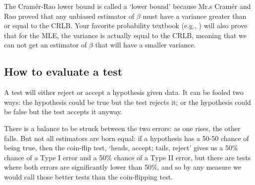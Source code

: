 
The Cram\'er-Rao lower bound is
called a `lower bound' because Mr.s Cram\'er and Rao proved that any
unbiased estimator of $\beta$ must have a variance greater than or equal to the
CRLB. Your favorite probability textbook (e.g., \cite{casella:berger})
will also prove that for the MLE, the variance is actually equal to the
CRLB, meaning that we can not get an estimator of $\beta$ that will
have a smaller variance.

\subsection{How to evaluate a test}
A test will either reject or accept a hypothesis given data. It can be
fooled two ways: the hypothesis could be true but the test rejects it;
or the hypothesis could be false but the test accepts it anyway. 

\marginaliafixed{16}{Evaluation vocab}{
Here are some vocabulary terms; if you are in a stats class right now,
you will be tested on this:

Likelihood of a \vocab{Type I error} $\equiv\alpha$: rejecting the null when it is true.

Likelihood of a \vocab{Type II error} $\equiv\beta$: accepting the null when
it is false.

\airq{Power}$\equiv 1-\beta$, or the likelihood of rejecting a false null.\blindvocab{power}

\airq{Unbiased}$\equiv (1-\beta)\geq \alpha\ \forall$ values of the parameter.
I.e., you are less likely to accept the null when it is false than when
it is true.\blindvocab{unbiased estimator}

\airq{Consistency}$\equiv$ the power $\to 1$ as $n\to \infty$.\blindvocab{consistency}
}

There
is a balance to be struck between the two errors: as one rises, the
other falls. But not all estimators are born equal: if a hypothesis has a 50-50 chance of being true, then the coin-flip test, `heads, accept;
tails, reject' gives us a 50\% chance of a Type I error
and a 50\% chance of a Type II error, but there are tests where both
errors are significantly lower than 50\%, and so by any measure we would
call those better tests than the coin-flipping test. 

